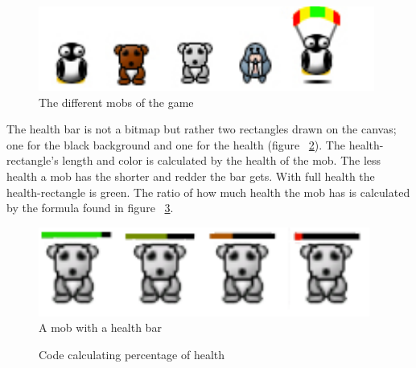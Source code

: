 \begin{figure}[here]
\begin{center}
\includegraphics[scale=0.6]{pics/chapters/chapter4/mobs}
\end{center}
\caption{The different mobs of the game}
\label{fig:mobs}
\end{figure}

The health bar is not a bitmap but rather two rectangles drawn on the canvas; one for the black background and one for the health (figure ~\ref{fig:mobHealthBar}). The health-rectangle's length and color is calculated by the health of the mob. The less health a mob has the shorter and redder the bar gets. With full health the health-rectangle is green. The ratio of how much health the mob has is calculated by the formula found in figure ~\ref{fig:codeExMobHealth}.

\begin{figure}[here]

\begin{center}

\includegraphics[scale=0.6]{pics/chapters/chapter4/mobhealth}

\end{center}

\caption{A mob with a health bar}
\label{fig:mobHealthBar}
\end{figure}

\begin{figure}[htb]

\begin{small}

\end{small}

\caption{Code calculating percentage of health}
\label{fig:codeExMobHealth}

\end{figure}
